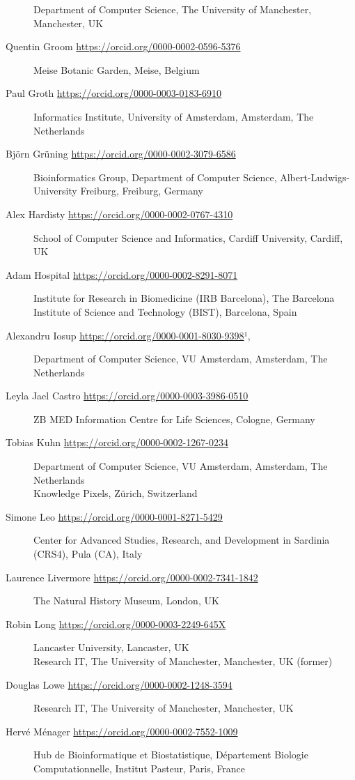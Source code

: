 \begin{description}
Department of Computer Science, The University of Manchester,
Manchester, UK
\item[Quentin Groom \url{https://orcid.org/0000-0002-0596-5376}]
Meise Botanic Garden, Meise, Belgium
\item[Paul Groth \url{https://orcid.org/0000-0003-0183-6910}]
Informatics Institute, University of Amsterdam, Amsterdam, The
Netherlands
\item[Björn Grüning \url{https://orcid.org/0000-0002-3079-6586}]
Bioinformatics Group, Department of Computer Science,
Albert-Ludwigs-University Freiburg, Freiburg, Germany
\item[Alex Hardisty \url{https://orcid.org/0000-0002-0767-4310}]
School of Computer Science and Informatics, Cardiff University, Cardiff,
UK
\item[Adam Hospital \url{https://orcid.org/0000-0002-8291-8071}]
Institute for Research in Biomedicine (IRB Barcelona), The Barcelona
Institute of Science and Technology (BIST), Barcelona, Spain
\item[Alexandru Iosup \url{https://orcid.org/0000-0001-8030-9398}¹,]
Department of Computer Science, VU Amsterdam, Amsterdam, The Netherlands
\item[Leyla Jael Castro \url{https://orcid.org/0000-0003-3986-0510}]
ZB MED Information Centre for Life Sciences, Cologne, Germany
\item[Tobias Kuhn \url{https://orcid.org/0000-0002-1267-0234}]
Department of Computer Science, VU Amsterdam, Amsterdam, The Netherlands\\
Knowledge Pixels, Zürich, Switzerland
\item[Simone Leo \url{https://orcid.org/0000-0001-8271-5429}]
Center for Advanced Studies, Research, and Development in Sardinia
(CRS4), Pula (CA), Italy
\item[Laurence Livermore \url{https://orcid.org/0000-0002-7341-1842}]
The Natural History Museum, London, UK
\item[Robin Long \url{https://orcid.org/0000-0003-2249-645X}]
Lancaster University, Lancaster, UK\\
Research IT, The University of Manchester, Manchester, UK (former)
\item[Douglas Lowe \url{https://orcid.org/0000-0002-1248-3594}]
Research IT, The University of Manchester, Manchester, UK
\item[Hervé Ménager \url{https://orcid.org/0000-0002-7552-1009}]
Hub de Bioinformatique et Biostatistique, Département Biologie
Computationnelle, Institut Pasteur, Paris, France

\end{description}
